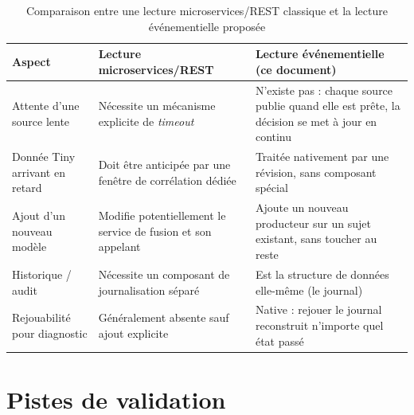 \documentclass[11pt,a4paper]{article}
\begin{document}
\begin{table}[h]
\centering
\small
\begin{tabular}{@{}p{4.8cm}p{4.6cm}p{5.4cm}@{}}
\toprule
\textbf{Aspect} & \textbf{Lecture microservices/REST} & \textbf{Lecture événementielle (ce document)} \\
\midrule
Attente d'une source lente & Nécessite un mécanisme explicite de \emph{timeout} & N'existe pas : chaque source publie quand elle est prête, la décision se met à jour en continu \\
Donnée Tiny arrivant en retard & Doit être anticipée par une fenêtre de corrélation dédiée & Traitée nativement par une révision, sans composant spécial \\
Ajout d'un nouveau modèle & Modifie potentiellement le service de fusion et son appelant & Ajoute un nouveau producteur sur un sujet existant, sans toucher au reste \\
Historique / audit & Nécessite un composant de journalisation séparé & Est la structure de données elle-même (le journal) \\
Rejouabilité pour diagnostic & Généralement absente sauf ajout explicite & Native : rejouer le journal reconstruit n'importe quel état passé \\
\bottomrule
\end{tabular}
\caption{Comparaison entre une lecture microservices/REST classique et la lecture événementielle proposée}
\end{table}

\section{Pistes de validation}
\end{document}
